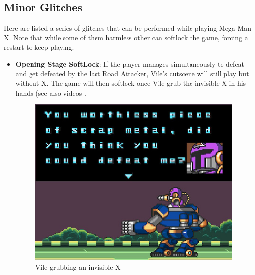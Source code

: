 \subsection{Minor Glitches}
Here are listed a series of glitches that can be performed while playing Mega Man X. Note that while some of them harmless other can softlock the game, forcing a restart to keep playing.
\begin{itemize}
	\item \textbf{Opening Stage SoftLock}: If the player manages simultaneously to defeat and get defeated by the last Road Attacker, Vile's cutscene will still play but without X. The game will then softlock once Vile grub the invisible X in his hands (see also videos .
	\begin{figure}[htp]
		\centering
		\includegraphics[width=0.5\linewidth]{figures/X1/Miscs/Intro_softlock.jpg}
		\caption{Vile grubbing an invisible X}
	\end{figure}
	

\end{itemize}

